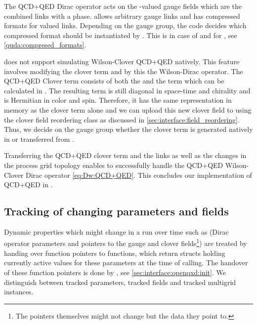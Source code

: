The QCD+QED Dirac operator acts on the -valued gauge fields which are the combined  links with a  phase.
\Quda allows arbitrary gauge links and has compressed formats for  valued links.
Depending on the gauge group, the code decides which compressed format should be instantiated by \quda.
This is  in case of  and  for , see \cref{quda:compresed_formats}.

\Quda does not support simulating Wilson-Clover QCD+QED natively.
This feature involves modifying the clover term and by this the Wilson-Dirac operator.
The QCD+QED Clover term consists of both the  and the  term which can be calculated in \openqxd.
The resulting term is still diagonal in space-time and chirality and is Hermitian in color and spin.
Therefore, it has the same representation in memory as the  clover term alone and we can upload this new clover field to \quda using the clover field reordering class as discussed in \cref{sec:interface:field_reordering}.
Thus, we decide on the gauge group whether the clover term is generated natively in \quda or transferred from \openqxd.

Transferring the QCD+QED clover term and the  links as well as the changes in the process grid topology enables \quda to successfully handle the QCD+QED Wilson-Clover Dirac operator \cref{eq:Dw:QCD+QED}.
This concludes our implementation of QCD+QED in \quda.

\subsection{Tracking of changing parameters and fields}
\label{sec:interface:track_params}


Dynamic properties which might change in a run over time such as
  (Dirac operator parameters and
  pointers to the gauge and clover fields\footnote{The pointers themselves might not change but the data they point to.})
are treated by handing over function pointers to functions, which return structs holding currently active values for these parameters at the time of calling.
The handover of these function pointers is done by , see \cref{sec:interface:openqxd:init}.
We distinguish between tracked parameters, tracked fields and tracked multigrid instances.

